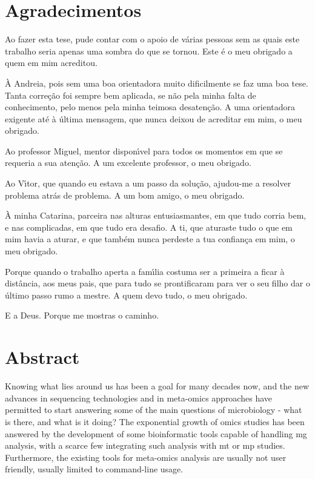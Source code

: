 \documentclass[
  oneside,
  11pt, a4paper,
  footinclude=true,
  headinclude=true,
  cleardoublepage=empty
]{scrbook}
\author{Jo\~{a}o Carlos Sequeira da Costa}
\date{October, 2017} %
\begin{document}
	\umfrontcover	
	\umtitlepage	
	
	\chapter*{Agradecimentos}
	
	Ao fazer esta tese, pude contar com o apoio de v\'{a}rias pessoas sem as quais este trabalho seria apenas uma sombra do que se tornou. Este \'{e} o meu obrigado a quem em mim acreditou.

    \`{A} Andreia, pois sem uma boa orientadora muito dificilmente se faz uma boa tese. Tanta corre\c{c}\~{a}o foi sempre bem aplicada, se n\~{a}o pela minha falta de conhecimento, pelo menos pela minha teimosa desaten\c{c}\~{a}o. A uma orientadora exigente at\'{e} \`{a} \'{u}ltima mensagem, que nunca deixou de acreditar em mim, o meu obrigado.
    
    Ao professor Miguel, mentor dispon\'{\i}vel para todos os momentos em que se requeria a sua aten\c{c}\~{a}o. A um excelente professor, o meu obrigado.
    
    Ao V\'{\i}tor, que quando eu estava a um passo da solu\c{c}\~{a}o, ajudou-me a resolver problema atr\'{a}s de problema. A um bom amigo, o meu obrigado.
    
    \`{A} minha Catarina, parceira nas alturas entusiasmantes, em que tudo corria bem, e nas complicadas, em que tudo era desafio. A ti, que aturaste tudo o que em mim havia a aturar, e que tamb\'{e}m nunca perdeste a tua confian\c{c}a em mim, o meu obrigado.
    
    Porque quando o trabalho aperta a fam\'{\i}lia costuma ser a primeira a ficar \`{a} dist\^{a}ncia, aos meus pais, que para tudo se prontificaram para ver o seu filho dar o \'{u}ltimo passo rumo a mestre. A quem devo tudo, o meu obrigado.
    
    E a Deus. Porque me mostras o caminho.

	\chapter*{Abstract}
	Knowing what lies around us has been a goal for many decades now, and the new advances in sequencing technologies and in meta-omics approaches have permitted to start answering some of the main questions of microbiology - what is there, and what is it doing? The exponential growth of omics studies has been answered by the development of some bioinformatic tools capable of handling \gls{mg} analysis, with a scarce few integrating such analysis with \gls{mt} or \gls{mp} studies. Furthermore, the existing tools for meta-omics analysis are usually not user friendly, usually limited to command-line usage.
\end{document}
